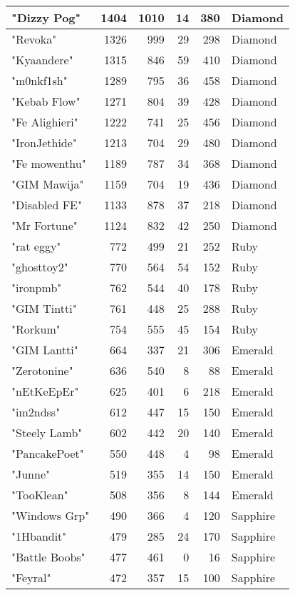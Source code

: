 \documentclass{article}
\begin{document}
\begin{table}[htbp]
\begin{tabular}{|l|r|r|r|r|l|}
"Dizzy Pog" & 1404 & 1010 & 14 & 380 & Diamond \\ \hline
"Revoka" & 1326 & 999 & 29 & 298 & Diamond \\ \hline
"Kyaandere" & 1315 & 846 & 59 & 410 & Diamond \\ \hline
"m0nkf1sh" & 1289 & 795 & 36 & 458 & Diamond \\ \hline
"Kebab Flow" & 1271 & 804 & 39 & 428 & Diamond \\ \hline
"Fe Alighieri" & 1222 & 741 & 25 & 456 & Diamond \\ \hline
"IronJethide" & 1213 & 704 & 29 & 480 & Diamond \\ \hline
"Fe mowenthu" & 1189 & 787 & 34 & 368 & Diamond \\ \hline
"GIM Mawija" & 1159 & 704 & 19 & 436 & Diamond \\ \hline
"Disabled FE" & 1133 & 878 & 37 & 218 & Diamond \\ \hline
"Mr Fortune" & 1124 & 832 & 42 & 250 & Diamond \\ \hline
"rat eggy" & 772 & 499 & 21 & 252 & Ruby \\ \hline
"ghosttoy2" & 770 & 564 & 54 & 152 & Ruby \\ \hline
"ironpmb" & 762 & 544 & 40 & 178 & Ruby \\ \hline
"GIM Tintti" & 761 & 448 & 25 & 288 & Ruby \\ \hline
"Rorkum" & 754 & 555 & 45 & 154 & Ruby \\ \hline
"GIM Lantti" & 664 & 337 & 21 & 306 & Emerald \\ \hline
"Zerotonine" & 636 & 540 & 8 & 88 & Emerald \\ \hline
"nEtKeEpEr" & 625 & 401 & 6 & 218 & Emerald \\ \hline
"im2ndss" & 612 & 447 & 15 & 150 & Emerald \\ \hline
"Steely Lamb" & 602 & 442 & 20 & 140 & Emerald \\ \hline
"PancakePoet" & 550 & 448 & 4 & 98 & Emerald \\ \hline
"Junne" & 519 & 355 & 14 & 150 & Emerald \\ \hline
"TooKlean" & 508 & 356 & 8 & 144 & Emerald \\ \hline
"Windows Grp" & 490 & 366 & 4 & 120 & Sapphire \\ \hline
"1Hbandit" & 479 & 285 & 24 & 170 & Sapphire \\ \hline
"Battle Boobs" & 477 & 461 & 0 & 16 & Sapphire \\ \hline
"Feyral" & 472 & 357 & 15 & 100 & Sapphire \\ \hline

\end{tabular}
\end{table}
\end{document}
